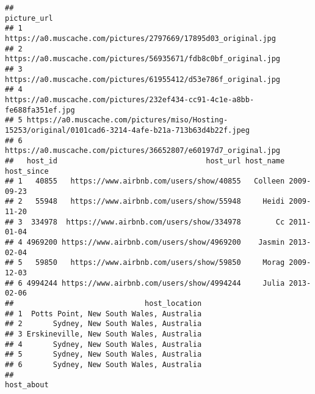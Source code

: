 \documentclass[
]{article}
\begin{document}
\begin{verbatim}
##                                                                                              picture_url
## 1                                         https://a0.muscache.com/pictures/2797669/17895d03_original.jpg
## 2                                        https://a0.muscache.com/pictures/56935671/fdb8c0bf_original.jpg
## 3                                        https://a0.muscache.com/pictures/61955412/d53e786f_original.jpg
## 4                              https://a0.muscache.com/pictures/232ef434-cc91-4c1e-a8bb-fe688fa351ef.jpg
## 5 https://a0.muscache.com/pictures/miso/Hosting-15253/original/0101cad6-3214-4afe-b21a-713b63d4b22f.jpeg
## 6                                        https://a0.muscache.com/pictures/36652807/e60197d7_original.jpg
##   host_id                                  host_url host_name host_since
## 1   40855   https://www.airbnb.com/users/show/40855   Colleen 2009-09-23
## 2   55948   https://www.airbnb.com/users/show/55948     Heidi 2009-11-20
## 3  334978  https://www.airbnb.com/users/show/334978        Cc 2011-01-04
## 4 4969200 https://www.airbnb.com/users/show/4969200    Jasmin 2013-02-04
## 5   59850   https://www.airbnb.com/users/show/59850     Morag 2009-12-03
## 6 4994244 https://www.airbnb.com/users/show/4994244     Julia 2013-02-06
##                              host_location
## 1  Potts Point, New South Wales, Australia
## 2       Sydney, New South Wales, Australia
## 3 Erskineville, New South Wales, Australia
## 4       Sydney, New South Wales, Australia
## 5       Sydney, New South Wales, Australia
## 6       Sydney, New South Wales, Australia
##                                                                                                                                                                                                                                                                                                                                                                                                                                                                                                                                                                                                                                                                                                                                                                                                                                                                                                                                                                                                                                                                                                                                                                                                                                                                                                             host_about

\end{verbatim}
\end{document}
